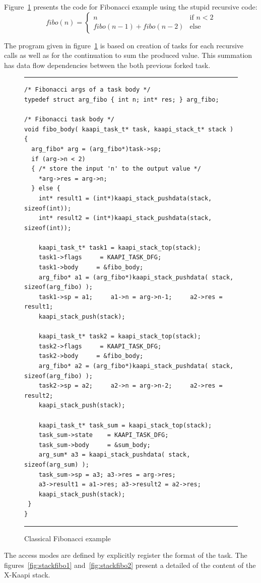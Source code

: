 \documentclass[12pt]{report}
\newcommand{\kaapi}{\textsc{X}-Kaapi\xspace}
\begin{document}
Figure~\ref{fig:fibo} presents the code for Fibonacci example using the stupid recursive code:
$$
fibo(n) = 
\left\{
\begin{array}{ll}
n & \mbox{if } n<2\\
fibo(n-1)+fibo(n-2) & \mbox{else}
\end{array}
\right.
$$

The program given in figure~\ref{fig:fibo} is based on creation of tasks for each recursive calls as well as for the continuation to sum the produced value. This summation has data flow dependencies between the both previous forked task.
\begin{figure}[!h]
\hrule
\small
\begin{verbatim}
/* Fibonacci args of a task body */
typedef struct arg_fibo { int n; int* res; } arg_fibo;

/* Fibonacci task body */
void fibo_body( kaapi_task_t* task, kaapi_stack_t* stack )
{
  arg_fibo* arg = (arg_fibo*)task->sp;
  if (arg->n < 2)
  { /* store the input 'n' to the output value */
    *arg->res = arg->n;
  } else {
    int* result1 = (int*)kaapi_stack_pushdata(stack, sizeof(int));
    int* result2 = (int*)kaapi_stack_pushdata(stack, sizeof(int));

    kaapi_task_t* task1 = kaapi_stack_top(stack);
    task1->flags     = KAAPI_TASK_DFG;
    task1->body     = &fibo_body;
    arg_fibo* a1 = (arg_fibo*)kaapi_stack_pushdata( stack, sizeof(arg_fibo) );
    task1->sp = a1;     a1->n = arg->n-1;     a2->res = result1;
    kaapi_stack_push(stack);

    kaapi_task_t* task2 = kaapi_stack_top(stack);
    task2->flags     = KAAPI_TASK_DFG;
    task2->body     = &fibo_body;
    arg_fibo* a2 = (arg_fibo*)kaapi_stack_pushdata( stack, sizeof(arg_fibo) );
    task2->sp = a2;     a2->n = arg->n-2;     a2->res = result2;
    kaapi_stack_push(stack);

    kaapi_task_t* task_sum = kaapi_stack_top(stack);
    task_sum->state    = KAAPI_TASK_DFG;
    task_sum->body     = &sum_body;
    arg_sum* a3 = kaapi_stack_pushdata( stack, sizeof(arg_sum) );
    task_sum->sp = a3; a3->res = arg->res; 
    a3->result1 = a1->res; a3->result2 = a2->res;
    kaapi_stack_push(stack);    
 }
}
\end{verbatim}
\caption{Classical Fibonacci example}
\vspace*{1ex}
\label{fig:fibo}
\hrule
\end{figure}
The access modes are defined by explicitly register the format of the task.
The figures~\ref{fig:stackfibo1} and~\ref{fig:stackfibo2} present a detailed of the content of the \kaapi stack.
\end{document}
